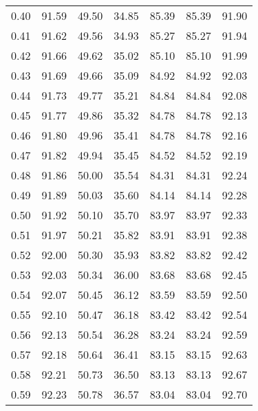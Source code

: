 \begin{tabular}{|c|c|c|c|c|c|c|}
      0.40 &     91.59 &     49.50 &      34.85 &   85.39 &      85.39 &         91.90 \\
      0.41 &     91.62 &     49.56 &      34.93 &   85.27 &      85.27 &         91.94 \\
      0.42 &     91.66 &     49.62 &      35.02 &   85.10 &      85.10 &         91.99 \\
      0.43 &     91.69 &     49.66 &      35.09 &   84.92 &      84.92 &         92.03 \\
      0.44 &     91.73 &     49.77 &      35.21 &   84.84 &      84.84 &         92.08 \\
      0.45 &     91.77 &     49.86 &      35.32 &   84.78 &      84.78 &         92.13 \\
      0.46 &     91.80 &     49.96 &      35.41 &   84.78 &      84.78 &         92.16 \\
      0.47 &     91.82 &     49.94 &      35.45 &   84.52 &      84.52 &         92.19 \\
      0.48 &     91.86 &     50.00 &      35.54 &   84.31 &      84.31 &         92.24 \\
      0.49 &     91.89 &     50.03 &      35.60 &   84.14 &      84.14 &         92.28 \\
      0.50 &     91.92 &     50.10 &      35.70 &   83.97 &      83.97 &         92.33 \\
      0.51 &     91.97 &     50.21 &      35.82 &   83.91 &      83.91 &         92.38 \\
      0.52 &     92.00 &     50.30 &      35.93 &   83.82 &      83.82 &         92.42 \\
      0.53 &     92.03 &     50.34 &      36.00 &   83.68 &      83.68 &         92.45 \\
      0.54 &     92.07 &     50.45 &      36.12 &   83.59 &      83.59 &         92.50 \\
      0.55 &     92.10 &     50.47 &      36.18 &   83.42 &      83.42 &         92.54 \\
      0.56 &     92.13 &     50.54 &      36.28 &   83.24 &      83.24 &         92.59 \\
      0.57 &     92.18 &     50.64 &      36.41 &   83.15 &      83.15 &         92.63 \\
      0.58 &     92.21 &     50.73 &      36.50 &   83.13 &      83.13 &         92.67 \\
      0.59 &     92.23 &     50.78 &      36.57 &   83.04 &      83.04 &         92.70 \\

\end{tabular}
